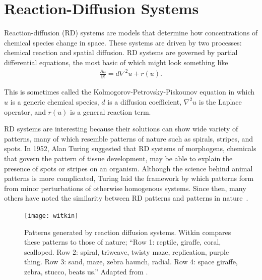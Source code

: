 \chapter{Reaction-Diffusion Systems}

	Reaction-diffusion (RD) systems are models that determine how concentrations of chemical species change in space. These systems are driven by two processes: chemical reaction and spatial diffusion. RD systems are governed by partial differential equations, the most basic of which might look something like
	\begin{align}
		\frac{\partial u}{\partial t} = d \nabla^2 u + r(u).
		\label{eq:KPP}
	\end{align}

This is sometimes called the Kolmogorov-Petrovsky-Piskounov equation in which $u$ is a generic chemical species, $d$ is a diffusion coefficient, $\nabla^2 u$ is the Laplace operator, and $r(u)$ is a general reaction term.	

RD systems are interesting because their solutions can show wide variety of patterns, many of which resemble patterns of nature such as spirals, stripes, and spots. In 1952, Alan Turing suggested that RD systems of morphogens, chemicals that govern the pattern of tissue development, may be able to explain the presence of spots or stripes on an organism. Although the science behind animal patterns is more complicated, Turing laid the framework by which patterns form from minor perturbations of otherwise homogenous systems. Since then, many others have noted the similarity between RD patterns and patterns in nature~.

\begin{figure}[h]
	\centering
	\texttt{[image: witkin]}
         \caption{Patterns generated by reaction diffusion systems. Witkin compares these patterns to those of nature; ``Row 1: reptile, giraffe, coral, scalloped. Row 2: spiral, triweave, twisty maze, replication, purple thing. Row 3: sand, maze, zebra haunch, radial. Row 4: space giraffe, zebra, stucco, beats us.'' Adapted from \protect{}.} \label{fig:witkin}
\end{figure}
	
